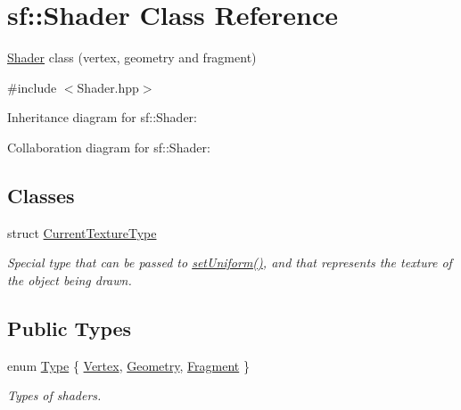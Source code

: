 \hypertarget{classsf_1_1_shader}{}\section{sf\+:\+:Shader Class Reference}
\label{classsf_1_1_shader}


\hyperlink{classsf_1_1_shader}{Shader} class (vertex, geometry and fragment)  




{\ttfamily \#include $<$Shader.\+hpp$>$}



Inheritance diagram for sf\+:\+:Shader\+:


Collaboration diagram for sf\+:\+:Shader\+:
\subsection*{Classes}
\begin{DoxyCompactItemize}
\item 
struct \hyperlink{structsf_1_1_shader_1_1_current_texture_type}{Current\+Texture\+Type}
\begin{DoxyCompactList}\small\item\em Special type that can be passed to \hyperlink{classsf_1_1_shader_abf78e3bea1e9b0bab850b6b0a0de29c7}{set\+Uniform()}, and that represents the texture of the object being drawn. \end{DoxyCompactList}\end{DoxyCompactItemize}
\subsection*{Public Types}
\begin{DoxyCompactItemize}
\item 
enum \hyperlink{classsf_1_1_shader_afaa1aa65e5de37b74d047da9def9f9b3}{Type} \{ \hyperlink{classsf_1_1_shader_afaa1aa65e5de37b74d047da9def9f9b3a8718008f827eb32e29bbdd1791c62dce}{Vertex}, 
\hyperlink{classsf_1_1_shader_afaa1aa65e5de37b74d047da9def9f9b3a812421100fd57456727375938fb62788}{Geometry}, 
\hyperlink{classsf_1_1_shader_afaa1aa65e5de37b74d047da9def9f9b3ace6e88eec3a56b2e55ee3c8e64e9b89a}{Fragment}
 \}\begin{DoxyCompactList}\small\item\em Types of shaders. \end{DoxyCompactList}
\end{DoxyCompactItemize}
